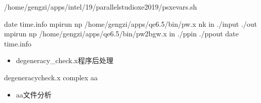 \documentclass[a4paper,12pt,english]{sphinxmanual}
\begin{document}
\begin{sphinxVerbatim}[commandchars=\\\{\}]


 
 /home/gengzi/apps/intel/19/parallel\PYGZus{}studio\PYGZus{}xe\PYGZus{}2019/psxevars.sh

date  \PYGZgt{}\PYGZgt{} time.info
mpirun \PYGZhy{}np  /home/gengzi/apps/qe\PYGZhy{}6.5/bin/pw.x \PYGZhy{}nk   \PYGZhy{}in ./input \PYGZgt{} ./out
mpirun \PYGZhy{}np  /home/gengzi/apps/qe\PYGZhy{}6.5/bin/pw2bgw.x \PYGZhy{}in ./pp\PYGZus{}in \PYGZgt{} ./pp\PYGZus{}out
date  \PYGZgt{}\PYGZgt{} time.info
\end{sphinxVerbatim}
\begin{itemize}
\item {} 
\sphinxAtStartPar
degeneracy\_check.x程序后处理

\end{itemize}

\begin{sphinxVerbatim}[commandchars=\\\{\}]
degeneracy\PYGZus{}check.x complex \PYGZgt{}\PYGZgt{} aa
\end{sphinxVerbatim}
\begin{itemize}
\item {} 
\sphinxAtStartPar
aa文件分析

\end{itemize}
\end{document}
